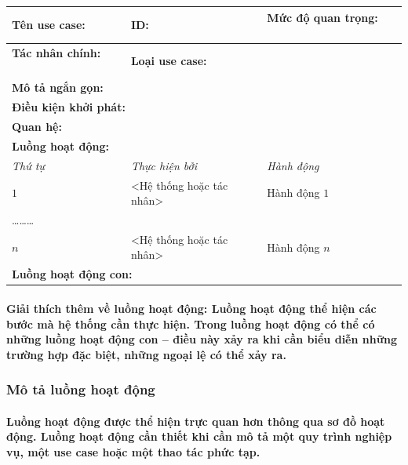 \documentclass{article}
\begin{document}
      \begin{center}
        \begin{tabular}{|l|l|l|}
          \hline
          \textbf{Tên use case:} $ \qquad $ & \textbf{ID:} $ \qquad $ & \textbf{Mức độ quan trọng:} $ \qquad $ \\
          \hline
          \textbf{Tác nhân chính:} $ \qquad $ & \multicolumn{2}{|l|}{\textbf{Loại use case:} $ \qquad $} \\
          \hline
          \multicolumn{3}{|l|}{\textbf{Mô tả ngắn gọn:} $ \qquad $} \\
          \hline
          \multicolumn{3}{|l|}{\textbf{Điều kiện khởi phát:} $ \qquad $} \\
          \hline
          \multicolumn{3}{|l|}{\textbf{Quan hệ:} $ \qquad $} \\
          \hline
          \multicolumn{3}{|l|}{\textbf{Luồng hoạt động:} $ \qquad $} \\
          \hline
          \textit{Thứ tự} & \textit{Thực hiện bởi} & \textit{Hành động} \\
          \hline
          $1$ & <Hệ thống hoặc tác nhân> & Hành động $1$\\
          \hline
          \multicolumn{3}{|l|}{\ldots\ldots\ldots}\\
          \hline
          $n$ & <Hệ thống hoặc tác nhân> & Hành động $n$ \\
          \hline
          \multicolumn{3}{|l|}{\textbf{Luồng hoạt động con:} $ \qquad $} \\
          \hline
        \end{tabular}
      \end{center}
      \paragraph{\textnormal{
        Giải thích thêm về luồng hoạt động: Luồng hoạt động thể hiện các bước mà hệ thống cần thực hiện. Trong luồng hoạt động có thể có những luồng hoạt động con -- điều này xảy ra khi cần biểu diễn những trường hợp đặc biệt, những ngoại lệ có thể xảy ra.
      }}
    
    \subsubsection{Mô tả luồng hoạt động}
      
      \paragraph{\textnormal{
        Luồng hoạt động được thể hiện trực quan hơn thông qua sơ đồ hoạt động. Luồng hoạt động cần thiết khi cần mô tả một quy trình nghiệp vụ, một use case hoặc một thao tác phức tạp.
      }}
\end{document}
